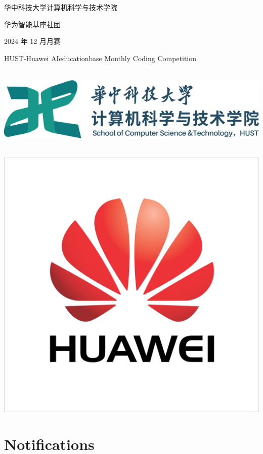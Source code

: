 \documentclass[12]{article}%
\begin{document}
	
	\begin{center}
		\LARGE 华中科技大学计算机科学与技术学院\par
		华为智能基座社团 \par
		2024 年 12 月月赛
		
		\Large HUST-Huawei AIeducationbase Monthly Coding Competition
		
		~\\
		
		\includegraphics[scale=0.5]{./pic/hustcs.png}
		
		~\\
		
		\includegraphics[scale=0.2]{./pic/huawei.jpg}
		
		
		
	\end{center}

\section*{Notifications}
\end{document}
